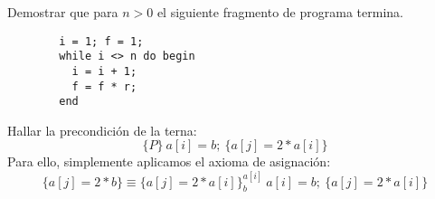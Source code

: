 \begin{ejercicio}
    Demostrar que para $n>0$ el siguiente fragmento de programa termina.
    \begin{verbatim}
        i = 1; f = 1;
        while i <> n do begin
          i = i + 1;
          f = f * r;
        end
    \end{verbatim}
\end{ejercicio}

\begin{ejercicio}
    Hallar la precondición de la terna:
    \begin{equation*}
        \{P\}\ a[i]=b;\ \{a[j] = 2\ast a[i]\}
    \end{equation*}
    Para ello, simplemente aplicamos el axioma de asignación:
    \begin{equation*}
        \{a[j]=2\ast b\} \equiv \{a[j]=2\ast a[i]\}_{b}^{a[i]}\ a[i]=b;\ \{a[j] = 2\ast a[i]\}
    \end{equation*}
\end{ejercicio}

